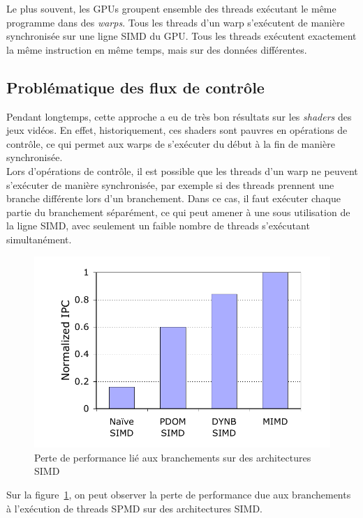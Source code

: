 \documentclass[11pt]{article}
\begin{document}
Le plus souvent, les GPUs groupent ensemble des threads exécutant le même programme dans des \emph{warps}. Tous les threads d'un warp s'exécutent de manière synchronisée sur une ligne SIMD du GPU.
Tous les threads exécutent exactement la même instruction en même temps, mais sur des données différentes.

\subsection{Problématique des flux de contrôle}

Pendant longtemps, cette approche a eu de très bon résultats sur les \emph{shaders} des jeux vidéos. En effet, historiquement, ces shaders sont pauvres en opérations de contrôle, ce qui permet aux warps de s'exécuter du début à la fin de manière synchronisée.
\\Lors d'opérations de contrôle, il est possible que les threads d'un warp ne peuvent s'exécuter de manière synchronisée, par exemple si des threads prennent une branche différente lors d'un branchement.
Dans ce cas, il faut exécuter chaque partie du branchement séparément, ce qui peut amener à une sous utilisation de la ligne SIMD, avec seulement un faible nombre de threads s'exécutant simultanément.

\begin{figure}[h]
   \caption{\label{IPC} Perte de performance lié aux branchements sur des architectures SIMD}
   \includegraphics[scale=.6]{ipc}
\end{figure}

Sur la figure~\ref{IPC}, on peut observer la perte de performance due aux branchements à l'exécution de threads SPMD sur des architectures SIMD.
\end{document}
